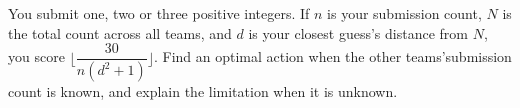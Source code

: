 You submit one, two or three positive integers. If $n$ is your submission count, $N$ is the total count across all teams, and $d$ is your closest guess's distance from $N$, you score $\lfloor\dfrac{30}{n(d^2+1)}\rfloor$. Find an optimal action when the other teams'submission count is known, and explain the limitation when it is unknown.
